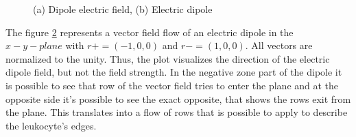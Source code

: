 \begin{figure}
\begin{subfigure}[b]{0.5\textwidth}
		\caption{ }
		\label{fig:dipole}
	\end{subfigure}
	\caption{(a) Dipole electric field, (b) Electric dipole}
	\label{fig:fielddipole}
\end{figure}
The figure \ref{fig:fielddipole} represents a vector field flow of an electric dipole in the $x-y-plane$ with $r+=(-1,0,0) $ and $ r-=(1,0,0)$. All vectors are normalized to the unity. Thus, the plot visualizes the direction of the electric dipole field, but not the field strength. In the negative zone part of the dipole it is possible to see that row of the vector field tries to enter the plane and at the opposite side it’s possible to see the exact opposite, that shows the rows exit from the plane. This translates into a flow of rows that is possible to apply to describe the leukocyte's edges.

\bigskip


